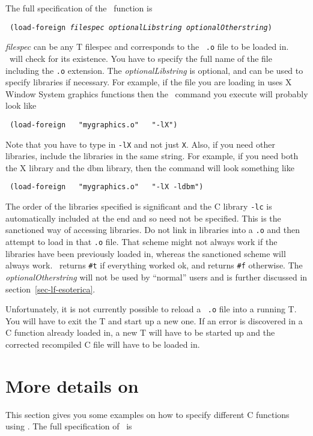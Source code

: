 The full specification of the \lf\ function is
\begin{center}
\tt
(load-foreign {\em filespec}
	{\em optionalLibstring} {\em optionalOtherstring})
\end{center}
{\em filespec\/} can be any T filespec and corresponds to
the \unix\ {\tt .o} file to be loaded in.
\lf\ will check for its existence.
You have to specify the full name of the file including the {\tt .o}
extension.
The {\em optionalLibstring\/} is optional, and can be used to specify
libraries if necessary.
For example, if the file you are loading in uses X Window System
graphics functions
then the \lf\ command you execute will probably look like
\begin{center}
\tt
(load-foreign~~ \verb!"!mygraphics.o\verb!"!~~ \verb!"!-lX\verb!"!)
\end{center}
Note that you have to type in {\tt -lX} and not just {\tt X}.
Also, if you need other libraries, include the libraries in the same
string.
For example, if you need both the X library and the dbm library,
then the command will look something like
\begin{center}
\tt
(load-foreign~~ \verb!"!mygraphics.o\verb!"!~~ \verb!"!-lX -ldbm\verb!"!)
\end{center}
The order of the libraries specified is significant and the C library
{\tt -lc} is automatically included at the end and so need not be specified.
This is the sanctioned way of accessing libraries.
Do not link in libraries into a {\tt .o} and then attempt to load in
that {\tt .o} file.
That scheme might not always work if the libraries have been previously
loaded in, whereas the sanctioned scheme will always work.
\lf\ returns \verb!#t! if everything worked ok, and returns \verb!#f!
otherwise.
The {\em optionalOtherstring\/} will not be used by ``normal'' users
and is further discussed in section~\ref{sec-lf-esoterica}.

Unfortunately, it is not currently possible to reload a \unix\
{\tt .o} file into a running T.
You will have to exit the T and start up a new one.
If an error is discovered in a C function already loaded in, a new T
will have to be started up and the corrected recompiled C file will
have to be loaded in.

\section{More details on \df}
\label{sec-df-details}

This section gives you some examples on how to specify different C
functions using \df.
The full specification of \df\ is

